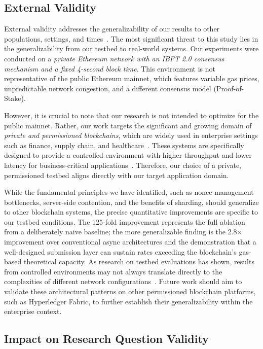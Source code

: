 \subsection{External Validity}

External validity addresses the generalizability of our results to other populations, settings, and times~\cite{shadish2002experimental}. The most significant threat to this study lies in the generalizability from our testbed to real-world systems. Our experiments were conducted on a \textit{private Ethereum network with an IBFT 2.0 consensus mechanism and a fixed 4-second block time}. This environment is not representative of the public Ethereum mainnet, which features variable gas prices, unpredictable network congestion, and a different consensus model (Proof-of-Stake).

However, it is crucial to note that our research is not intended to optimize for the public mainnet. Rather, our work targets the significant and growing domain of \textit{private and permissioned blockchains}, which are widely used in enterprise settings such as finance, supply chain, and healthcare~\cite{lewis2017blockchain}. These systems are specifically designed to provide a controlled environment with higher throughput and lower latency for business-critical applications~\cite{hyperledgerFabricDoc}. Therefore, our choice of a private, permissioned testbed aligns directly with our target application domain.

While the fundamental principles we have identified, such as nonce management bottlenecks, server-side contention, and the benefits of sharding, should generalize to other blockchain systems, the precise quantitative improvements are specific to our testbed conditions. The 125-fold improvement represents the full ablation from a deliberately naive baseline; the more generalizable finding is the 2.8$\times$ improvement over conventional async architectures and the demonstration that a well-designed submission layer can sustain rates exceeding the blockchain's gas-based theoretical capacity. As research on testbed evaluations has shown, results from controlled environments may not always translate directly to the complexities of different network configurations~\cite{allman2010pitfalls}. Future work should aim to validate these architectural patterns on other permissioned blockchain platforms, such as Hyperledger Fabric, to further establish their generalizability within the enterprise context.

\subsection{Impact on Research Question Validity}

